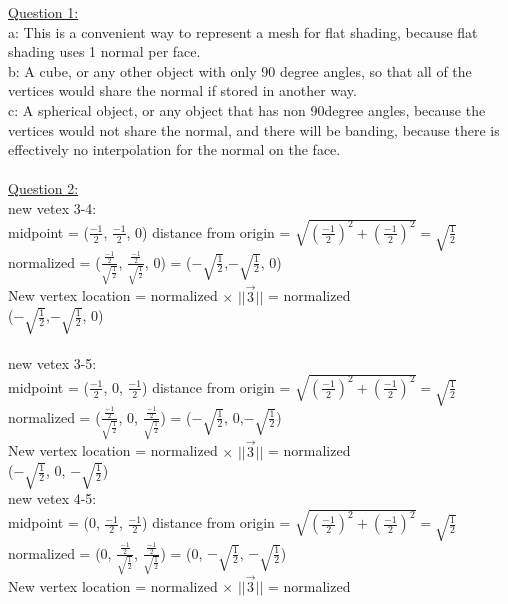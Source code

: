 \documentclass[12pt]{article}\usepackage{amsmath}
\begin{document}
\author{Joel Anna<annajoel@pdx.edu>}
\noindent
\underline{Question 1:}\\
a:
This is a convenient way to represent a mesh for flat shading, because flat shading uses 1 normal per face.\\
b:
A cube, or any other object with only 90 degree angles, so that all of the vertices would share the normal if stored in another way.\\
c:
A spherical object, or any object that has non 90degree angles, because the vertices would not share the normal, and there will be banding, because there is effectively no interpolation for the normal on the face.\\\\
\underline{Question 2:}\\
new vetex 3-4:\\
midpoint = ($\frac{-1}{2}$, $\frac{-1}{2}$, 0)
distance from origin = $\sqrt{(\frac{-1}{2})^2+(\frac{-1}{2})^2} = \sqrt{\frac{1}{2}}$\\
normalized = ($\frac{\frac{-1}{2}}{\sqrt{\frac{1}{2}}}$, $\frac{\frac{-1}{2}}{\sqrt{\frac{1}{2}}}$, 0) = ($-\sqrt{\frac{1}{2}}$,$-\sqrt{\frac{1}{2}}$, 0)\\
New vertex location = normalized $\times$ $||\overrightarrow{3}||$ = normalized\\
 ($-\sqrt{\frac{1}{2}}$,$-\sqrt{\frac{1}{2}}$, 0)\\\\
%
%
%
%
new vetex 3-5:\\
midpoint = ($\frac{-1}{2}$, 0, $\frac{-1}{2}$)
distance from origin = $\sqrt{(\frac{-1}{2})^2+(\frac{-1}{2})^2} = \sqrt{\frac{1}{2}}$\\
normalized = ($\frac{\frac{-1}{2}}{\sqrt{\frac{1}{2}}}$, 0, $\frac{\frac{-1}{2}}{\sqrt{\frac{1}{2}}}$) = ($-\sqrt{\frac{1}{2}}$, 0,$-\sqrt{\frac{1}{2}}$)\\
New vertex location = normalized $\times$ $||\overrightarrow{3}||$ = normalized\\
 ($-\sqrt{\frac{1}{2}}$, 0, $-\sqrt{\frac{1}{2}}$)\\
%
%
%
%
new vetex 4-5:\\
midpoint = (0, $\frac{-1}{2}$, $\frac{-1}{2}$)
distance from origin = $\sqrt{(\frac{-1}{2})^2+(\frac{-1}{2})^2} = \sqrt{\frac{1}{2}}$\\
normalized = (0, $\frac{\frac{-1}{2}}{\sqrt{\frac{1}{2}}}$, $\frac{\frac{-1}{2}}{\sqrt{\frac{1}{2}}}$) = (0, $-\sqrt{\frac{1}{2}}$, $-\sqrt{\frac{1}{2}}$)\\
New vertex location = normalized $\times$ $||\overrightarrow{3}||$ = normalized\\
\end{document}
